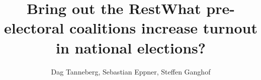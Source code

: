 
\usepackage[utf8]{inputenc}
\usepackage{graphicx}
\usepackage{rotating}
\usepackage{booktabs}
\usepackage{blindtext}

% 

\author{Dag Tanneberg, Sebastian Eppner, Steffen Ganghof}
\title{Bring out the Rest\newline What pre-electoral coalitions increase turnout in national elections?}
